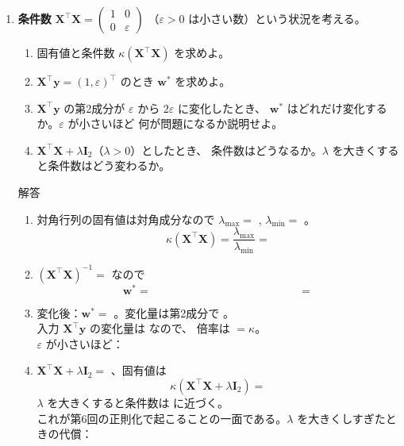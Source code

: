 \documentclass[a4paper,dvipdfmx]{jsarticle}
\newcommand{\提出期限}{2026年10月19日（月）}
\newcommand{\学籍番号}{0000000}
\newcommand{\氏名}{氏名を書く}
\newcommand{\提出日}{2026年10月19日}
\newenvironment{answer}{\begin{itembox}[l]{解答}}{\end{itembox}}
\begin{document}
\begin{enumerate}
  \item \textbf{条件数}\quad
    $\bm{X}^\top\bm{X} = \begin{pmatrix} 1 & 0 \\ 0 & \varepsilon \end{pmatrix}$
    （$\varepsilon > 0$ は小さい数）という状況を考える。
    \begin{enumerate}
      \item 固有値と条件数 $\kappa(\bm{X}^\top\bm{X})$ を求めよ。
      \item $\bm{X}^\top\bm{y} = (1, \varepsilon)^\top$ のとき $\bm{w}^*$ を求めよ。
      \item $\bm{X}^\top\bm{y}$ の第2成分が $\varepsilon$ から $2\varepsilon$ に変化したとき、
        $\bm{w}^*$ はどれだけ変化するか。$\varepsilon$ が小さいほど
        何が問題になるか説明せよ。
      \item $\bm{X}^\top\bm{X} + \lambda\bm{I}_2$（$\lambda > 0$）としたとき、
        条件数はどうなるか。$\lambda$ を大きくすると条件数はどう変わるか。
    \end{enumerate}
    \begin{answer}
      \begin{enumerate}
        \item 対角行列の固有値は対角成分なので $\lambda_{\max} = $ \phantom{XX}, $\lambda_{\min} = $ \phantom{XX}。
          \begin{equation*}
            \kappa(\bm{X}^\top\bm{X}) = \frac{\lambda_{\max}}{\lambda_{\min}} =
          \end{equation*}
        \item $(\bm{X}^\top\bm{X})^{-1} = $ \phantom{XXXXXXXXXX} なので
          \begin{equation*}
            \bm{w}^* = \phantom{XXXXXXXXXXXXXXXX} =
          \end{equation*}
        \item 変化後：$\bm{w}^* = $ \phantom{XXXXXXXX}。変化量は第2成分で \phantom{XXXX}。\\
          入力 $\bm{X}^\top\bm{y}$ の変化量は \phantom{XXXX} なので、
          倍率は \phantom{XXXX} $= \kappa$。\\
          $\varepsilon$ が小さいほど：
        \item $\bm{X}^\top\bm{X} + \lambda\bm{I}_2 = $ \phantom{XXXXXXXXXX}、固有値は \phantom{XXXXXXXX}
          \begin{equation*}
            \kappa(\bm{X}^\top\bm{X} + \lambda\bm{I}_2) =
          \end{equation*}
          $\lambda$ を大きくすると条件数は \phantom{XXXXXXXX} に近づく。\\
          これが第6回の正則化で起こることの一面である。$\lambda$ を大きくしすぎたときの代償：
      \end{enumerate}
    \end{answer}

\end{enumerate}
\end{document}
